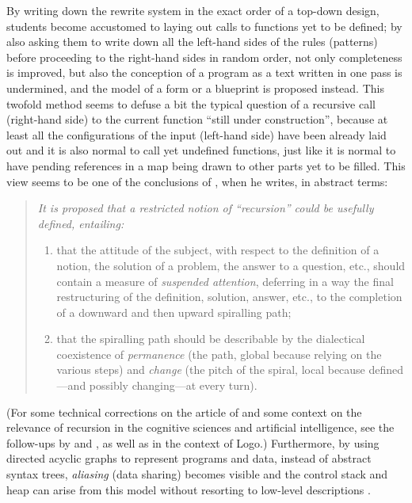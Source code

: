 \documentclass[11pt,a4paper]{article}
\newcommand\plang[1]{\textsf{#1}\xspace}
\begin{document}
By writing down the rewrite system in the exact order of a
top\hyp{}down design, students become accustomed to laying out calls
to functions yet to be defined; by also asking them to write down all
the left\hyp{}hand sides of the rules (patterns) before proceeding to
the right\hyp{}hand sides in random order, not only completeness is
improved, but also the conception of a program as a text written in
one pass is undermined, and the model of a form or a blueprint is
proposed instead. This twofold method seems to defuse a bit the
typical question of a recursive call (right\hyp{}hand side) to the
current function ``still under construction'', because at least all
the configurations of the input (left\hyp{}hand side) have been
already laid out and it is also normal to call yet undefined
functions, just like it is normal to have pending references in a map
being drawn to other parts yet to be filled. This view seems to be one
of the conclusions of \textcite{Vitale:1989}, when he writes, in
abstract terms:
\begin{quote}
\it It is proposed that a restricted notion of ``recursion'' could be
usefully defined, entailing:
\begin{enumerate}

  \item that the attitude of the subject, with respect to the
    definition of a notion, the solution of a problem, the answer to a
    question, etc., should contain a measure of \emph{suspended
      attention}, deferring in a way the final restructuring of the
    definition, solution, answer, etc., to the completion of a
    downward and then upward spiralling path;

  \item that the spiralling path should be describable by the
    dialectical coexistence of \emph{permanence} (the path, global
    because relying on the various steps) and \emph{change} (the pitch
    of the spiral, local because defined---and possibly changing---at
    every turn).

\end{enumerate}
\end{quote}
(For some technical corrections on the article of
\textcite{Vitale:1989} and some context on the relevance of recursion
in the cognitive sciences and artificial intelligence, see the
follow\hyp{}ups by \textcite{Trautteur:1989} and
\textcite{Apostel:1991}, as well as \textcite{Kieren:1989} in the
context of \plang{Logo}.) Furthermore, by using directed acyclic
graphs to represent programs and data, instead of abstract syntax
trees, \emph{aliasing} (data sharing) becomes visible and the control
stack and heap can arise from this model without resorting to
low\hyp{}level descriptions \citep{Rinderknecht:2012}.
\end{document}
